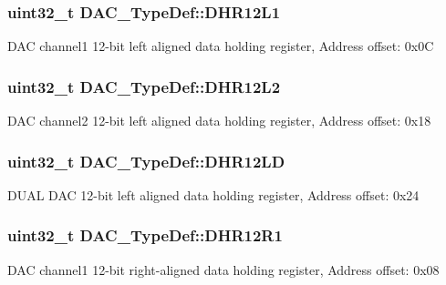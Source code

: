 \subsubsection[{\texorpdfstring{D\+H\+R12\+L1}{DHR12L1}}]{ uint32\+\_\+t D\+A\+C\+\_\+\+Type\+Def\+::\+D\+H\+R12\+L1}\hypertarget{struct_d_a_c___type_def_a5eb63912e39085e3e13d64bdb0cf38bd}{}\label{struct_d_a_c___type_def_a5eb63912e39085e3e13d64bdb0cf38bd}
D\+AC channel1 12-\/bit left aligned data holding register, Address offset\+: 0x0C 
\subsubsection[{\texorpdfstring{D\+H\+R12\+L2}{DHR12L2}}]{ uint32\+\_\+t D\+A\+C\+\_\+\+Type\+Def\+::\+D\+H\+R12\+L2}\hypertarget{struct_d_a_c___type_def_a9f612b6b3e065e810e5a2fb254d6a40b}{}\label{struct_d_a_c___type_def_a9f612b6b3e065e810e5a2fb254d6a40b}
D\+AC channel2 12-\/bit left aligned data holding register, Address offset\+: 0x18 
\subsubsection[{\texorpdfstring{D\+H\+R12\+LD}{DHR12LD}}]{ uint32\+\_\+t D\+A\+C\+\_\+\+Type\+Def\+::\+D\+H\+R12\+LD}\hypertarget{struct_d_a_c___type_def_aea4d055e3697999b44cdcf2702d79d40}{}\label{struct_d_a_c___type_def_aea4d055e3697999b44cdcf2702d79d40}
D\+U\+AL D\+AC 12-\/bit left aligned data holding register, Address offset\+: 0x24 
\subsubsection[{\texorpdfstring{D\+H\+R12\+R1}{DHR12R1}}]{ uint32\+\_\+t D\+A\+C\+\_\+\+Type\+Def\+::\+D\+H\+R12\+R1}\hypertarget{struct_d_a_c___type_def_afbfd2855cdb81939b4efc58e08aaf3e5}{}\label{struct_d_a_c___type_def_afbfd2855cdb81939b4efc58e08aaf3e5}
D\+AC channel1 12-\/bit right-\/aligned data holding register, Address offset\+: 0x08 

